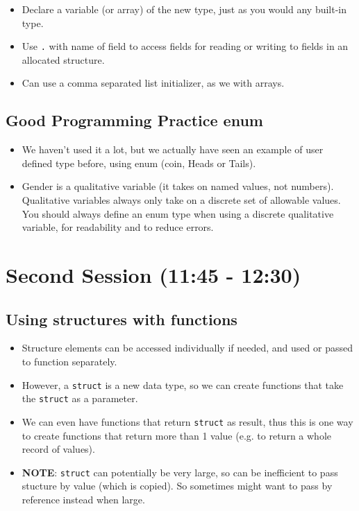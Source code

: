 \documentclass[11pt]{article}
\begin{document}
\begin{itemize}
\item Declare a variable (or array) of the new type, just as you would any
  built-in type.
\item Use \verb~.~ with name of field to access fields for reading or writing to fields in
  an allocated structure.
\item Can use a comma separated list initializer, as we with arrays.
\end{itemize}
\subsection{Good Programming Practice enum}
\label{sec-1-4}

\begin{itemize}
\item We haven't used it a lot, but we actually have seen an example of
  user defined type before, using enum (coin, Heads or Tails).
\item Gender is a qualitative variable (it takes on named values, not
  numbers).  Qualitative variables always only take on a discrete set
  of allowable values.  You should always define an enum type when
  using a discrete qualitative variable, for readability and to reduce
  errors.
\end{itemize}
\section{Second Session (11:45 - 12:30)}
\label{sec-2}
\subsection{Using structures with functions}
\label{sec-2-1}

\begin{itemize}
\item Structure elements can be accessed individually if needed, and used or passed
  to function separately.
\item However, a \verb~struct~ is a new data type, so we can create functions that take
  the \verb~struct~ as a parameter.
\item We can even have functions that return \verb~struct~ as result, thus this is one
  way to create functions that return more than 1 value (e.g. to return a
  whole record of values).
\item \textbf{NOTE}: \verb~struct~ can potentially be very large, so can be inefficient to
  pass stucture by value (which is copied).  So sometimes might want to
  pass by reference instead when large.
\end{itemize}
\end{document}
